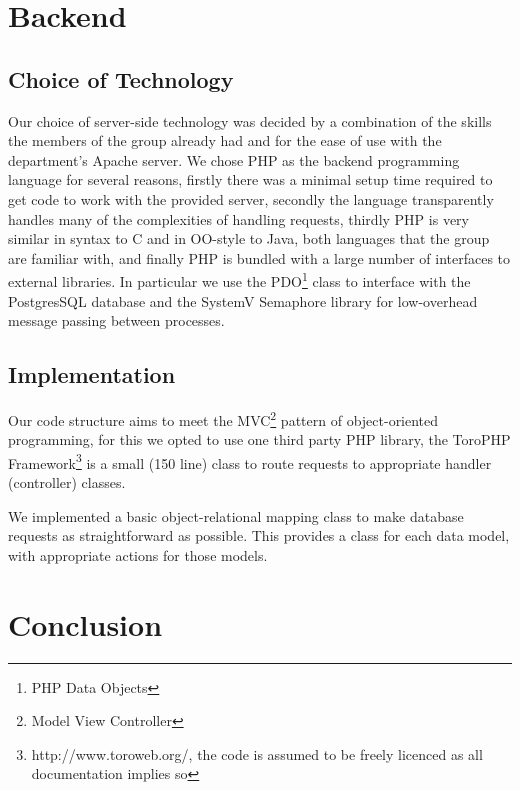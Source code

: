 \documentclass[12pt]{amsart}
\begin{document}
\section{Backend}
  \subsection{Choice of Technology}
    \begin{flushleft}
      Our choice of server-side technology was decided by a combination of the
      skills the members of the group already had and for the ease of use with
      the department's Apache server. We chose PHP as the backend programming
      language for several reasons, firstly there was a minimal setup time
      required to get code to work with the provided server, secondly the
      language transparently handles many of the complexities of handling
      requests, thirdly PHP is very similar in syntax to C and in OO-style to
      Java, both languages that the group are familiar with, and finally PHP is
      bundled with a large number of interfaces to external libraries.  In
      particular we use the PDO\footnote{PHP Data Objects} class to interface
      with the PostgresSQL database and the SystemV Semaphore library for
      low-overhead message passing between processes.
    \end{flushleft}

  \subsection{Implementation}
    \begin{flushleft}
      Our code structure aims to meet the MVC\footnote{Model View Controller} 
      pattern of object-oriented programming, for this we opted to use one third 
      party PHP library, the ToroPHP Framework\footnote{http://www.toroweb.org/, 
      the code is assumed to be freely licenced as all documentation implies so} 
      is a small (150 line) class to route requests to appropriate handler 
      (controller) classes.

      We implemented a basic object-relational mapping class to make database 
      requests as straightforward as possible. This provides a class for each 
      data model, with appropriate actions for those models.
    \end{flushleft}

\section{Conclusion}
\end{document}
